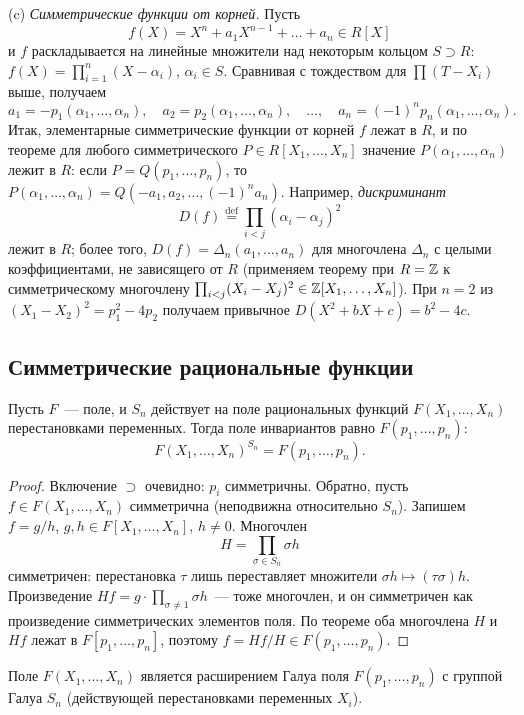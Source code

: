 \begin{remark}[5.37]
(c) \emph{Симметрические функции от корней.} Пусть
\[
f(X)=X^n+a_1X^{n-1}+\dots+a_n\in R[X]
\]
и $f$ раскладывается на линейные множители над некоторым кольцом $S\supset R$:
$f(X)=\prod_{i=1}^n(X-\alpha_i)$, $\alpha_i\in S$. Сравнивая с тождеством для $\prod(T-X_i)$ выше, получаем
\[
a_1=-p_1(\alpha_1,\dots,\alpha_n),\quad a_2=p_2(\alpha_1,\dots,\alpha_n),\quad\dots,\quad
a_n=(-1)^np_n(\alpha_1,\dots,\alpha_n).
\]
Итак, элементарные симметрические функции от корней $f$ лежат в $R$, и по теореме  для любого симметрического
$P\in R[X_1,\dots,X_n]$ значение $P(\alpha_1,\dots,\alpha_n)$ лежит в $R$: если $P=Q(p_1,\dots,p_n)$, то
$P(\alpha_1,\dots,\alpha_n)=Q(-a_1,a_2,\dots,(-1)^na_n)$. Например, \emph{дискриминант}
\[
D(f)\overset{\mathrm{def}}{=}\prod_{i<j}(\alpha_i-\alpha_j)^2
\]
лежит в $R$; более того, $D(f)=\Delta_n(a_1,\dots,a_n)$ для многочлена $\Delta_n$ с целыми коэффициентами, не зависящего
от $R$ (применяем теорему при $R=\mathbb Z$ к симметрическому многочлену $\prod_{i<j}(X_i-X_j)^2\in\mathbb Z[X_1,\dots,X_n]$). При $n=2$
из $(X_1-X_2)^2=p_1^2-4p_2$ получаем привычное $D(X^2+bX+c)=b^2-4c$.
\end{remark}

\subsection*{Симметрические рациональные функции}

\begin{theorem}
Пусть $F$~--- поле, и $S_n$ действует на поле рациональных функций $F(X_1,\dots,X_n)$ перестановками переменных. Тогда
поле инвариантов равно $F(p_1,\dots,p_n)$:
\[
F(X_1,\dots,X_n)^{S_n}=F(p_1,\dots,p_n).
\]
\end{theorem}

\begin{proof}
Включение $\supset$ очевидно: $p_i$ симметричны. Обратно, пусть $f\in F(X_1,\dots,X_n)$ симметрична (неподвижна
относительно $S_n$). Запишем $f=g/h$, $g,h\in F[X_1,\dots,X_n]$, $h\ne0$. Многочлен
\[
H=\prod_{\sigma\in S_n}\sigma h
\]
симметричен: перестановка $\tau$ лишь переставляет множители $\sigma h\mapsto(\tau\sigma)h$. Произведение
$Hf=g\cdot\prod_{\sigma\ne1}\sigma h$~--- тоже многочлен, и он симметричен как произведение симметрических элементов поля.
По теореме  оба многочлена $H$ и $Hf$ лежат в $F[p_1,\dots,p_n]$, поэтому $f=Hf/H\in F(p_1,\dots,p_n)$.
\end{proof}

\begin{corollary}[5.39]
Поле $F(X_1,\dots,X_n)$ является расширением Галуа поля $F(p_1,\dots,p_n)$ с группой Галуа $S_n$ (действующей
перестановками переменных $X_i$).
\end{corollary}

